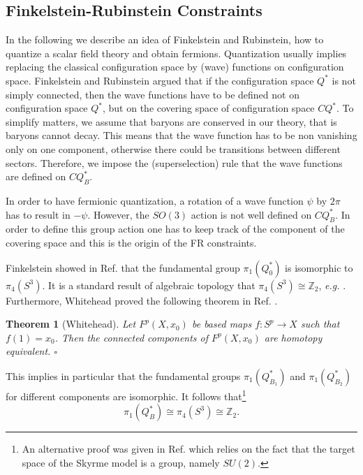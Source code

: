 \documentclass[a4paper,12pt]{article}
\newtheorem {theorem}{Theorem}[section]
\begin{document}
\subsection{Finkelstein-Rubinstein Constraints}
\label{FRconstraints}

In the following we describe an idea of Finkelstein and Rubinstein, how to 
quantize a scalar field theory and obtain fermions. Quantization usually
implies replacing the classical configuration space by (wave) functions on 
configuration space. 
Finkelstein and Rubinstein argued that if the configuration space 
$Q^*$ is not simply connected, then the wave functions have to be defined 
not on configuration space $Q^*$, but on the covering space of 
configuration space $CQ^*$. To simplify matters, we assume that baryons
are conserved in our theory, that is baryons cannot decay. This means that 
the wave function has to be non vanishing only on one component, otherwise 
there could be transitions between different sectors. Therefore, we impose 
the (superselection) rule that the wave functions are defined on $CQ^*_B$.

In order to have fermionic quantization, a rotation of a wave function 
$\psi$ by $2 \pi$ has to result in $-\psi$. However, the $SO(3)$ action  
is not well defined on $CQ^*_B$. In order to define this group action one 
has to keep track of the component of the covering space and this is the 
origin of the FR constraints.

Finkelstein showed in Ref. \cite{Finkelstein:1966ft} that the
fundamental group $\pi_1(Q_0^*)$ is isomorphic to $\pi_4(S^3)$. 
It is a standard  result of algebraic topology that $\pi_4(S^3) \cong
{\mathbb Z}_2$, {\it e.g.} \cite{Hatcher:2002}. Furthermore, Whitehead
proved the following theorem in Ref. \cite{Whitehead:1946}.
%
\begin{theorem}[Whitehead]
\label{Whitehead}
Let $F^p(X,x_0)$ be based maps $f: S^p \to X$ such that $f(1) = x_0$.
Then the connected components of $F^p(X,x_0)$ are homotopy equivalent. 
\hfill $\square$
\end{theorem}
%
This implies in particular that the fundamental groups $\pi_1(Q_{B_1}^*)$
and $\pi_1(Q_{B_2}^*)$ for different components  are isomorphic.
It follows that\footnote{An alternative proof was given in Ref. 
\cite{Giulini:1993gd} which relies on the fact that the target space of  
the Skyrme model is a group, namely $SU(2)$.}
%
\begin{equation}
\pi_1(Q_B^*) \cong \pi_4(S^3) \cong {\mathbb Z}_2.
\end{equation}
%
\end{document}
